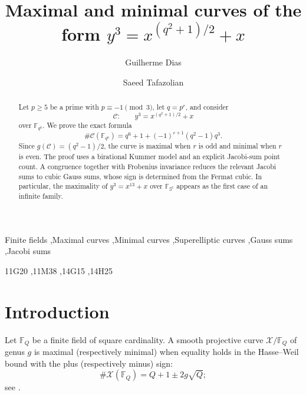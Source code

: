 \documentclass[3p,10pt]{elsarticle}
\theoremstyle{remark}
\newcommand{\cC}{\mathcal{C}}
\newcommand{\F}{\mathbb{F}}
\begin{document}
\begin{frontmatter}

\title{Maximal and minimal curves of the form $y^3=x^{(q^2+1)/2}+x$}

\author[IFTM]{Guilherme Dias}

\author[imecc]{Saeed Tafazolian}

\address[IFTM]{Instituto Federal do Tri\^angulo Mineiro (IFTM), Campus Campina Verde, Fazenda Campo Belo, Rodovia BR-364, Km 153, Campina Verde, MG 38270-000, Brazil}

\address[imecc]{Departamento de Matem\'atica, Instituto de Matem\'atica, Estat\'istica e Computa\c{c}\~ao Cient\'ifica (IMECC), Universidade Estadual de Campinas (UNICAMP), Rua S\'ergio Buarque de Holanda, 651, Campinas, SP 13083-859, Brazil}

\begin{abstract}
Let $p\ge 5$ be a prime with $p\equiv -1\pmod 3$, let $q=p^r$, and consider
\[
\cC:\qquad y^3=x^{(q^2+1)/2}+x
\]
over $\F_{q^6}$. We prove the exact formula
\[
\#\cC(\F_{q^6})=q^6+1+(-1)^{r+1}(q^2-1)q^3.
\]
Since $g(\cC)=(q^2-1)/2$, the curve is maximal when $r$ is odd and minimal when $r$ is even. The proof uses a birational Kummer model and an explicit Jacobi-sum point count. A congruence together with Frobenius invariance reduces the relevant Jacobi sums to cubic Gauss sums, whose sign is determined from the Fermat cubic. In particular, the maximality of $y^3=x^{13}+x$ over $\F_{5^6}$ appears as the first case of an infinite family.
\end{abstract}

\begin{keyword}
Finite fields \sep Maximal curves \sep Minimal curves \sep Superelliptic curves \sep Gauss sums \sep Jacobi sums

\MSC[2020] 11G20 \sep 11M38 \sep 14G15 \sep 14H25
\end{keyword}

\end{frontmatter}

\section{Introduction}\label{sec:intro}

Let $\F_Q$ be a finite field of square cardinality. A smooth projective curve $\mathcal X/\F_Q$ of genus $g$ is maximal (respectively minimal) when equality holds in the Hasse--Weil bound with the plus (respectively minus) sign:
\[
\#\mathcal X(\F_Q)=Q+1\pm 2g\sqrt Q;
\]
see \cite{HirschfeldKorchmarosTorres,Stichtenoth}.
\end{document}
